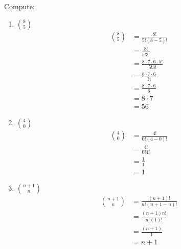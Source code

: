 \guard



\begin{exmp}
\label{exmp:computeChoose}
  Compute:
  \begin{enumerate}
    \item ${8 \choose 5 }$\\
      \begin{align*}
        {8 \choose 5 } &= \frac{ 8! }{ 5!( 8-5)! }\\
                       &= \frac{ 8! }{ 5!3! } \\
                       &= \frac{ 8\cdot 7\cdot 6 \cdot 5! }{ 5!3! } \\
                       &= \frac{ 8\cdot 7\cdot 6 }{ 3! } \\
                       &= \frac{ 8\cdot 7\cdot 6 }{ 6 } \\
                       &= 8\cdot 7 \\
                       &= 56
      \end{align*}
    \item ${4 \choose 0 }$\\
      \begin{align*}
        {4 \choose 0 } &= \frac{ 4! }{ 0!( 4-0)! }\\
                       &= \frac{ 4! }{ 0!4! } \\
                       &= \frac{ 1 }{ 1 } \\
                       &= 1
      \end{align*}
    \item ${ {n+1} \choose n }$\\
      \begin{align*}
        { {n+1} \choose n }  &= \frac{ (n+1)! }{ n!( n+1-n)! } \\
                             &= \frac{ (n+1)n! }{ n!( 1)! } \\
                             &= \frac{ (n+1) }{ 1 } \\
                             &= n+1
      \end{align*}
  \end{enumerate}
\end{exmp}

